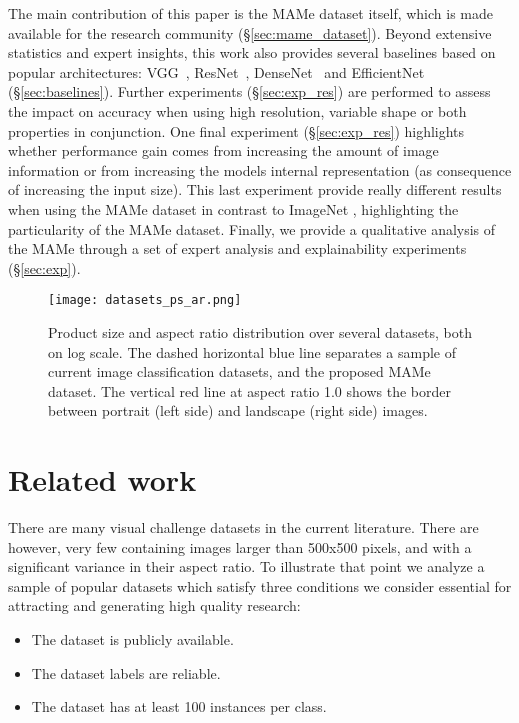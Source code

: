 \documentclass{article}
\begin{document}
The main contribution of this paper is the MAMe dataset itself, which is made available for the research community (\S\ref{sec:mame_dataset}). Beyond extensive statistics and expert insights, this work also provides several baselines based on popular architectures: VGG~\citep{simonyan2014very}, ResNet~\citep{he2016deep}, DenseNet~\citep{huang2017densely} and EfficientNet~\citep{tan2019efficientnet} (\S\ref{sec:baselines}). Further experiments (\S\ref{sec:exp_res}) are performed to assess the impact on accuracy when using high resolution, variable shape or both properties in conjunction. One final experiment (\S\ref{sec:exp_res}) highlights whether performance gain comes from increasing the amount of image information or from increasing the models internal representation (as consequence of increasing the input size). This last experiment provide really different results when using the MAMe dataset in contrast to ImageNet \citep{sandler2019nondiscriminative}, highlighting the particularity of the MAMe dataset. Finally, we provide a qualitative analysis of the MAMe through a set of expert analysis and explainability experiments (\S\ref{sec:exp}).

\begin{figure*}[t]
\centering
\texttt{[image: datasets\_ps\_ar.png]}
\caption{Product size and aspect ratio distribution over several datasets, both on log scale. The dashed horizontal blue line separates a sample of current image classification datasets, and the proposed MAMe dataset. The vertical red line at aspect ratio 1.0 shows the border between portrait (left side) and landscape (right side) images.}
\label{fig:ps_ar_distr}
\end{figure*}

\section{Related work}\label{sec:rw}

There are many visual challenge datasets in the current literature. There are however, very few containing images larger than 500x500 pixels, and with a significant variance in their aspect ratio. To illustrate that point we analyze a sample of popular datasets which satisfy three conditions we consider essential for attracting and generating high quality research:

\begin{itemize}
    \item The dataset is publicly available.
    \item The dataset labels are reliable.
    \item The dataset has at least 100 instances per class. 
\end{itemize}
\end{document}
